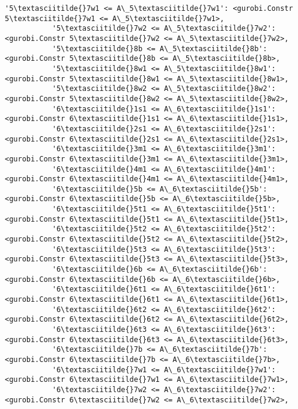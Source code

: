 \documentclass[11pt]{article}
\begin{document}
\begin{Verbatim}[commandchars=\\\{\}]
           '5\textasciitilde{}7w1 <= A\_5\textasciitilde{}7w1': <gurobi.Constr 5\textasciitilde{}7w1 <= A\_5\textasciitilde{}7w1>,
           '5\textasciitilde{}7w2 <= A\_5\textasciitilde{}7w2': <gurobi.Constr 5\textasciitilde{}7w2 <= A\_5\textasciitilde{}7w2>,
           '5\textasciitilde{}8b <= A\_5\textasciitilde{}8b': <gurobi.Constr 5\textasciitilde{}8b <= A\_5\textasciitilde{}8b>,
           '5\textasciitilde{}8w1 <= A\_5\textasciitilde{}8w1': <gurobi.Constr 5\textasciitilde{}8w1 <= A\_5\textasciitilde{}8w1>,
           '5\textasciitilde{}8w2 <= A\_5\textasciitilde{}8w2': <gurobi.Constr 5\textasciitilde{}8w2 <= A\_5\textasciitilde{}8w2>,
           '6\textasciitilde{}1s1 <= A\_6\textasciitilde{}1s1': <gurobi.Constr 6\textasciitilde{}1s1 <= A\_6\textasciitilde{}1s1>,
           '6\textasciitilde{}2s1 <= A\_6\textasciitilde{}2s1': <gurobi.Constr 6\textasciitilde{}2s1 <= A\_6\textasciitilde{}2s1>,
           '6\textasciitilde{}3m1 <= A\_6\textasciitilde{}3m1': <gurobi.Constr 6\textasciitilde{}3m1 <= A\_6\textasciitilde{}3m1>,
           '6\textasciitilde{}4m1 <= A\_6\textasciitilde{}4m1': <gurobi.Constr 6\textasciitilde{}4m1 <= A\_6\textasciitilde{}4m1>,
           '6\textasciitilde{}5b <= A\_6\textasciitilde{}5b': <gurobi.Constr 6\textasciitilde{}5b <= A\_6\textasciitilde{}5b>,
           '6\textasciitilde{}5t1 <= A\_6\textasciitilde{}5t1': <gurobi.Constr 6\textasciitilde{}5t1 <= A\_6\textasciitilde{}5t1>,
           '6\textasciitilde{}5t2 <= A\_6\textasciitilde{}5t2': <gurobi.Constr 6\textasciitilde{}5t2 <= A\_6\textasciitilde{}5t2>,
           '6\textasciitilde{}5t3 <= A\_6\textasciitilde{}5t3': <gurobi.Constr 6\textasciitilde{}5t3 <= A\_6\textasciitilde{}5t3>,
           '6\textasciitilde{}6b <= A\_6\textasciitilde{}6b': <gurobi.Constr 6\textasciitilde{}6b <= A\_6\textasciitilde{}6b>,
           '6\textasciitilde{}6t1 <= A\_6\textasciitilde{}6t1': <gurobi.Constr 6\textasciitilde{}6t1 <= A\_6\textasciitilde{}6t1>,
           '6\textasciitilde{}6t2 <= A\_6\textasciitilde{}6t2': <gurobi.Constr 6\textasciitilde{}6t2 <= A\_6\textasciitilde{}6t2>,
           '6\textasciitilde{}6t3 <= A\_6\textasciitilde{}6t3': <gurobi.Constr 6\textasciitilde{}6t3 <= A\_6\textasciitilde{}6t3>,
           '6\textasciitilde{}7b <= A\_6\textasciitilde{}7b': <gurobi.Constr 6\textasciitilde{}7b <= A\_6\textasciitilde{}7b>,
           '6\textasciitilde{}7w1 <= A\_6\textasciitilde{}7w1': <gurobi.Constr 6\textasciitilde{}7w1 <= A\_6\textasciitilde{}7w1>,
           '6\textasciitilde{}7w2 <= A\_6\textasciitilde{}7w2': <gurobi.Constr 6\textasciitilde{}7w2 <= A\_6\textasciitilde{}7w2>,

\end{Verbatim}
\end{document}

